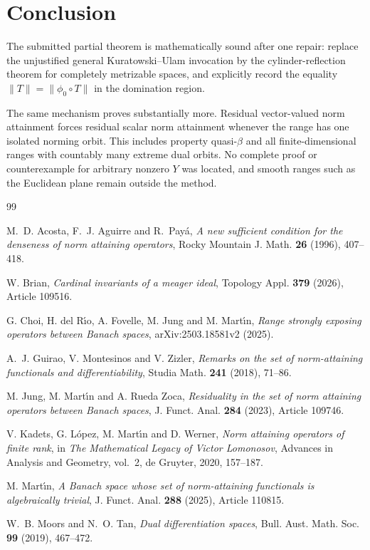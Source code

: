 \documentclass[11pt]{article}
\theoremstyle{definition}
\theoremstyle{remark}
\newcommand{\norm}[1]{\lVert #1\rVert}
\begin{document}
\section{Conclusion}

The submitted partial theorem is mathematically sound after one repair: replace the unjustified general Kuratowski--Ulam invocation by the cylinder-reflection theorem for completely metrizable spaces, and explicitly record the equality $\norm T=\norm{\phi_0\circ T}$ in the domination region.

The same mechanism proves substantially more.  Residual vector-valued norm attainment forces residual scalar norm attainment whenever the range has one isolated norming orbit.  This includes property quasi-$\beta$ and all finite-dimensional ranges with countably many extreme dual orbits.  No complete proof or counterexample for arbitrary nonzero $Y$ was located, and smooth ranges such as the Euclidean plane remain outside the method.

\begin{thebibliography}{99}

M.~D. Acosta, F.~J. Aguirre and R.~Pay\'{a},
\emph{A new sufficient condition for the denseness of norm attaining operators},
Rocky Mountain J. Math. \textbf{26} (1996), 407--418.

W. Brian,
\emph{Cardinal invariants of a meager ideal},
Topology Appl. \textbf{379} (2026), Article 109516.

G. Choi, H. del R\'{\i}o, A. Fovelle, M. Jung and M. Mart\'{\i}n,
\emph{Range strongly exposing operators between Banach spaces},
arXiv:2503.18581v2 (2025).

A.~J. Guirao, V. Montesinos and V. Zizler,
\emph{Remarks on the set of norm-attaining functionals and differentiability},
Studia Math. \textbf{241} (2018), 71--86.

M. Jung, M. Mart\'{\i}n and A. Rueda Zoca,
\emph{Residuality in the set of norm attaining operators between Banach spaces},
J. Funct. Anal. \textbf{284} (2023), Article 109746.

V. Kadets, G. L\'{o}pez, M. Mart\'{\i}n and D. Werner,
\emph{Norm attaining operators of finite rank},
in \emph{The Mathematical Legacy of Victor Lomonosov},
Advances in Analysis and Geometry, vol.~2, de Gruyter, 2020, 157--187.

M. Mart\'{\i}n,
\emph{A Banach space whose set of norm-attaining functionals is algebraically trivial},
J. Funct. Anal. \textbf{288} (2025), Article 110815.

W.~B. Moors and N.~O. Tan,
\emph{Dual differentiation spaces},
Bull. Aust. Math. Soc. \textbf{99} (2019), 467--472.

\end{thebibliography}
\end{document}
